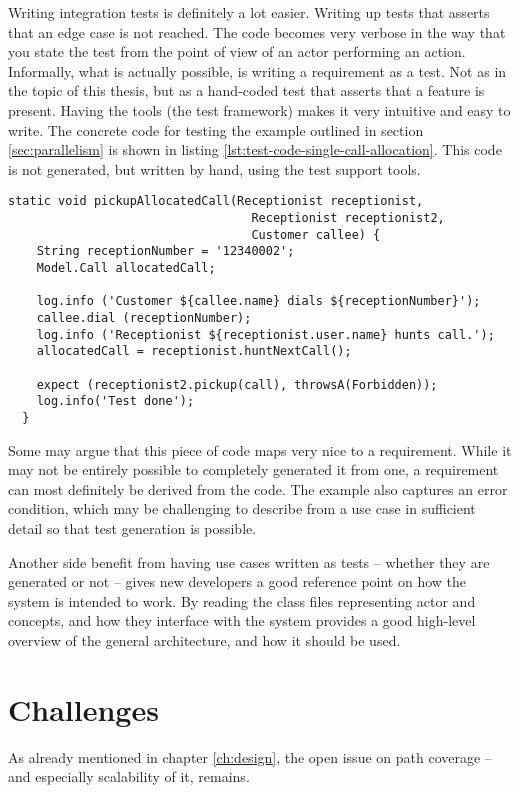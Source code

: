 Writing integration tests is definitely a lot easier. Writing up tests that asserts that an edge case is not reached. The code becomes very verbose in the way that you state the test from the point of view of an actor performing an action. Informally, what is actually possible, is writing a requirement as a test. Not as in the topic of this thesis, but as a hand-coded test that asserts that a feature is present. Having the tools (the test framework) makes it very intuitive and easy to write. The concrete code for testing the example outlined in section \ref{sec:parallelism} is shown in listing \ref{lst:test-code-single-call-allocation}. This code is not generated, but written by hand, using the test support tools.
\begin{lstlisting}[style=Dart, caption=Test code for single call allocation,label={lst:test-code-single-call-allocation}]
  static void pickupAllocatedCall(Receptionist receptionist, 
                                  Receptionist receptionist2, 
                                  Customer callee) {
    String receptionNumber = '12340002';
    Model.Call allocatedCall;
    
    log.info ('Customer ${callee.name} dials ${receptionNumber}');
    callee.dial (receptionNumber);
    log.info ('Receptionist ${receptionist.user.name} hunts call.');
    allocatedCall = receptionist.huntNextCall();
   
    expect (receptionist2.pickup(call), throwsA(Forbidden));
    log.info('Test done');
  }
\end{lstlisting}
Some may argue that this piece of code maps very nice to a requirement. While it may not be entirely possible to completely generated it from one, a requirement can most definitely be derived from the code. The example also captures an error condition, which may be challenging to describe from a use case in sufficient detail so that test generation is possible.\medskip

\noindent Another side benefit from having use cases written as tests -- whether they are generated or not -- gives new developers a good reference point on how the system is intended to work. By reading the class files representing actor and concepts, and how they interface with the system provides a good high-level overview of the general architecture, and how it should be used.
\section{Challenges}
As already mentioned in chapter \ref{ch:design}, the open issue on path coverage -- and especially scalability of it, remains.

